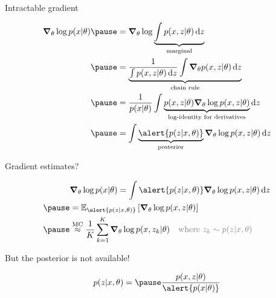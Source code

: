 \begin{frame}{Intractable gradient}

\begin{small}
\begin{equation*}
\begin{aligned}
\grad_\theta \log p(x|\theta) \pause &= \grad_\theta \log \underbrace{\int p(x, z|\theta) \dd{z}}_{\text{marginal}} \\ \pause
&= \underbrace{\frac{1}{\int p(x, z|\theta) \dd{z}} \int \grad_\theta p(x,z|\theta) \dd{z}}_{\text{chain rule}} \\ \pause
&= \frac{1}{p(x|\theta)} \int \underbrace{p(x,z|\theta) \grad_\theta \log p(x,z|\theta)}_{\text{log-identity for derivatives}} \dd{z} \\ \pause
&= \int \underbrace{\alert{p(z|x, \theta)}}_{\text{posterior}} \grad_\theta \log p(x,z|\theta) \dd{z} %
\end{aligned}
\end{equation*}
\end{small}



\end{frame}

\begin{frame}{Gradient estimates?}

\begin{equation*}
\begin{aligned}
&\grad_\theta \log p(x|\theta) = \int \alert{p(z|x, \theta)} \grad_\theta \log p(x,z|\theta) \dd{z} \\ \pause
&= \mathbb E_{\alert{p(z|x, \theta)}} \left[ \grad_\theta \log p(x,z|\theta) \right] \\ \pause
&\overset{\text{MC}}{\approx} \frac{1}{K} \sum_{k=1}^K \grad_\theta \log p(x, z_k|\theta) 
\quad \textcolor{gray}{\text{where }z_k \sim p(z|x, \theta)}
\end{aligned}
\end{equation*}

\pause But the posterior is not available!

\begin{equation*}
\begin{aligned}
	p(z|x, \theta) = \pause \frac{p(x, z|\theta)}{\alert{p(x|\theta)}} %
\end{aligned}
\end{equation*}

\end{frame}


